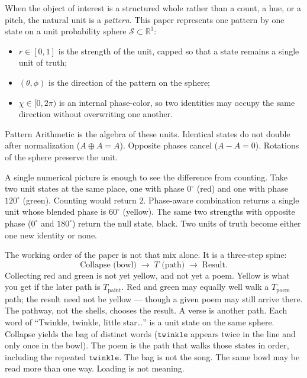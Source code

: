 \documentclass[12pt, a4paper]{article}
\begin{document}
When the object of interest is a structured whole rather than a
count, a hue, or a pitch, the natural unit is a \emph{pattern}.
This paper represents one pattern by one state on a unit
probability sphere $\mathcal{S} \subset \mathbb{R}^3$:
\begin{itemize}
    \item $r \in [0, 1]$ is the strength of the unit, capped so that a state remains a single unit of truth;
    \item $(\theta, \phi)$ is the direction of the pattern on the sphere;
    \item $\chi \in [0, 2\pi)$ is an internal phase-color, so two identities may occupy the same direction without overwriting one another.
\end{itemize}
Pattern Arithmetic is the algebra of these units. Identical states do not double after normalization ($A \oplus A = A$). Opposite phases cancel ($A - A = 0$). Rotations of the sphere preserve the unit.

A single numerical picture is enough to see the difference from counting. Take two unit states at the same place, one with phase $0^\circ$ (red) and one with phase $120^\circ$ (green). Counting would return $2$. Phase-aware combination returns a single unit whose blended phase is $60^\circ$ (yellow). The same two strengths with opposite phase ($0^\circ$ and $180^\circ$) return the null state, black. Two units of truth become either one new identity or none.

The working order of the paper is not that mix alone. It is a three-step spine:
\[
\text{Collapse (bowl)} \;\longrightarrow\; T\text{ (path)} \;\longrightarrow\; \text{Result}.
\]
Collecting red and green is not yet yellow, and not yet a poem.
Yellow is what you get if the later path is $T_{\mathrm{paint}}$.
Red and green may equally well walk a $T_{\mathrm{poem}}$ path; the
result need not be yellow --- though a given poem may still arrive
there. The pathway, not the shells, chooses the result. A verse is
another path.
Each word of ``Twinkle, twinkle, little star\ldots'' is a unit state
on the same sphere. Collapse yields the bag of distinct words
($\texttt{twinkle}$ appears twice in the line and only once in the
bowl). The poem is the path that walks those states in order,
including the repeated $\texttt{twinkle}$. The bag is not the song.
The same bowl may be read more than one way. Loading is not meaning.
\end{document}
